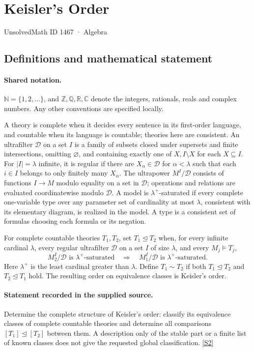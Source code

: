 \documentclass[11pt]{article}
\newcommand{\sref}[2]{\hyperlink{source:#1:#2}{[S#2]}}
\begin{document}
\setcounter{section}{1466}
\section{Keisler's Order}\label{1467}
{\small\sffamily UnsolvedMath ID 1467 · Algebra}
\subsection{Definitions and mathematical statement}

\paragraph{Shared notation.}$\mathbb N=\{1,2,\ldots\}$, and $\mathbb Z,\mathbb Q,\mathbb R,\mathbb C$ denote the integers, rationals, reals and complex numbers. Any other conventions are specified locally.


A theory is complete when it decides every sentence in its first-order language, and countable when its language is countable; theories here are consistent. An ultrafilter $\mathcal D$ on a set $I$ is a family of subsets closed under supersets and finite intersections, omitting $\varnothing$, and containing exactly one of $X,I\setminus X$ for each $X\subseteq I$. For $|I|=\lambda$ infinite, it is regular if there are $X_\alpha\in\mathcal D$ for $\alpha<\lambda$ such that each $i\in I$ belongs to only finitely many $X_\alpha$. The ultrapower $M^I/\mathcal D$ consists of functions $I\to M$ modulo equality on a set in $\mathcal D$; operations and relations are evaluated coordinatewise modulo $\mathcal D$. A model is $\lambda^+$-saturated if every complete one-variable type over any parameter set of cardinality at most $\lambda$, consistent with its elementary diagram, is realized in the model. A type is a consistent set of formulas choosing each formula or its negation.

For complete countable theories $T_1,T_2$, set $T_1\unlhd T_2$ when, for every infinite cardinal $\lambda$, every regular ultrafilter $\mathcal D$ on a set $I$ of size $\lambda$, and every $M_j\models T_j$,
\[
 M_2^I/\mathcal D\text{ is }\lambda^+\text{-saturated}
 \quad\Longrightarrow\quad
 M_1^I/\mathcal D\text{ is }\lambda^+\text{-saturated}.
\]
Here $\lambda^+$ is the least cardinal greater than $\lambda$. Define $T_1\sim T_2$ if both $T_1\unlhd T_2$ and $T_2\unlhd T_1$ hold. The resulting order on equivalence classes is Keisler's order.
\paragraph{Statement recorded in the supplied source.}
Determine the complete structure of Keisler's order: classify its equivalence classes of complete countable theories and determine all comparisons $[T_1]\unlhd[T_2]$ between them. A description only of the stable part or a finite list of known classes does not give the requested global classification. \sref{1467}{2}
\end{document}
